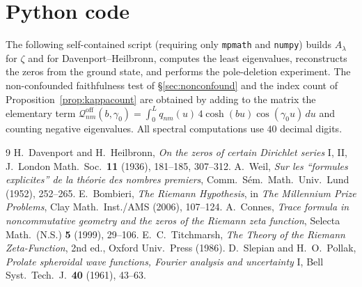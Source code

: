 \documentclass[11pt]{amsart}
\theoremstyle{definition}
\theoremstyle{remark}
\newcommand{\lam}{\lambda}
\begin{document}
\appendix
\section{Python code}\label{sec:code}

The following self-contained script (requiring only \texttt{mpmath} and \texttt{numpy}) builds $A_\lam$ for $\zeta$ and for Davenport--Heilbronn, computes the least eigenvalues, reconstructs the zeros from the ground state, and performs the pole-deletion experiment. The non-confounded faithfulness test of \S\ref{sec:nonconfound} and the index count of Proposition~\ref{prop:kappacount} are obtained by adding to the matrix the elementary term $\mathcal Q^{\mathrm{off}}_{nm}(b,\gamma_0)=\int_0^L q_{nm}(u)\,4\cosh(bu)\cos(\gamma_0u)\,du$ and counting negative eigenvalues. All spectral computations use $40$ decimal digits.



\begin{thebibliography}{9}
 H.~Davenport and H.~Heilbronn, \emph{On the zeros of certain Dirichlet series} I, II, J.~London Math.~Soc.\ \textbf{11} (1936), 181--185, 307--312.
 A.~Weil, \emph{Sur les ``formules explicites'' de la th\'eorie des nombres premiers}, Comm.~S\'em.~Math.~Univ.~Lund (1952), 252--265.
 E.~Bombieri, \emph{The Riemann Hypothesis}, in \emph{The Millennium Prize Problems}, Clay Math.~Inst./AMS (2006), 107--124.
 A.~Connes, \emph{Trace formula in noncommutative geometry and the zeros of the Riemann zeta function}, Selecta Math.\ (N.S.) \textbf{5} (1999), 29--106.
 E.~C.~Titchmarsh, \emph{The Theory of the Riemann Zeta-Function}, 2nd ed., Oxford Univ.~Press (1986).
 D.~Slepian and H.~O.~Pollak, \emph{Prolate spheroidal wave functions, Fourier analysis and uncertainty} I, Bell Syst.~Tech.~J.\ \textbf{40} (1961), 43--63.
\end{thebibliography}
\end{document}
